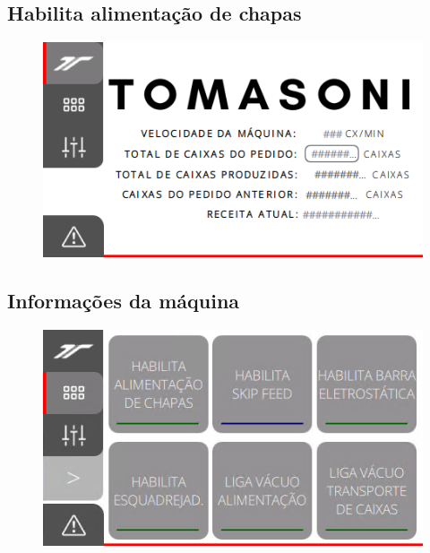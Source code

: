 \thispagestyle{fancy}
\vspace{\fill}
\subsection{\small Habilita alimentação de chapas}
\begin{figure}
    \centering
    \includegraphics{src/imagesICV/11-KTP400-Feeder/1.png}
\end{figure}

\newpage
\thispagestyle{fancy}
\vspace{\fill}
\subsection{\small Informações da máquina}
\begin{figure}
    \centering
    \includegraphics{src/imagesICV/11-KTP400-Feeder/2.png}
\end{figure}

\newpage
\thispagestyle{fancy}
\vspace{\fill}
